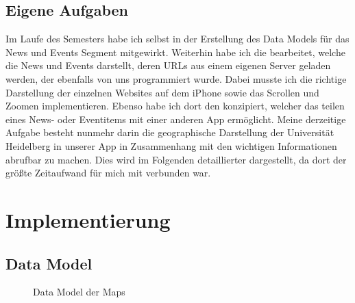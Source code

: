 \documentclass{report}
\begin{document}
\section{Eigene Aufgaben}

Im Laufe des Semesters habe ich selbst in der Erstellung des Data Models für das News und Events Segment mitgewirkt. Weiterhin habe ich die  bearbeitet, welche die News und Events darstellt, deren URLs aus einem eigenen Server geladen werden, der ebenfalls von uns programmiert wurde. Dabei musste ich die richtige Darstellung der einzelnen Websites auf dem iPhone sowie das Scrollen und Zoomen implementieren. Ebenso habe ich dort den  konzipiert, welcher das teilen eines News- oder Eventitems mit einer anderen App ermöglicht. Meine derzeitige Aufgabe besteht nunmehr darin die geographische Darstellung der Universität Heidelberg in unserer App in Zusammenhang mit den wichtigen Informationen abrufbar zu machen. Dies wird im Folgenden detaillierter dargestellt, da dort der größte Zeitaufwand für mich mit verbunden war.

\newpage

\chapter{Implementierung}

\section{Data Model}


\begin{figure}[ht]\label{bild_1}
\centering {}
\caption{Data Model der Maps}
\end{figure}
\end{document}
